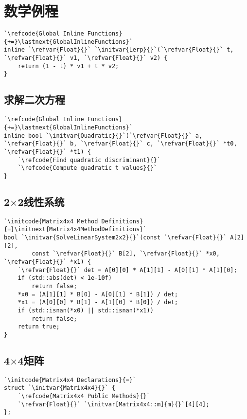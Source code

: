 \section{数学例程}\label{sec:数学例程}

\begin{lstlisting}
`\refcode{Global Inline Functions}{+=}\lastnext{GlobalInlineFunctions}`
inline `\refvar{Float}{}` `\initvar{Lerp}{}`(`\refvar{Float}{}` t, `\refvar{Float}{}` v1, `\refvar{Float}{}` v2) {
    return (1 - t) * v1 + t * v2;
}
\end{lstlisting}
\subsection{求解二次方程}\label{sub:求解二次方程}
\begin{lstlisting}
`\refcode{Global Inline Functions}{+=}\lastnext{GlobalInlineFunctions}`
inline bool `\initvar{Quadratic}{}`(`\refvar{Float}{}` a, `\refvar{Float}{}` b, `\refvar{Float}{}` c, `\refvar{Float}{}` *t0, `\refvar{Float}{}` *t1) {
    `\refcode{Find quadratic discriminant}{}`
    `\refcode{Compute quadratic t values}{}`
}
\end{lstlisting}

\subsection{2$\times$2线性系统}\label{sub:2x2线性系统}
\begin{lstlisting}
`\initcode{Matrix4x4 Method Definitions}{=}\initnext{Matrix4x4MethodDefinitions}`
bool `\initvar{SolveLinearSystem2x2}{}`(const `\refvar{Float}{}` A[2][2],
        const `\refvar{Float}{}` B[2], `\refvar{Float}{}` *x0, `\refvar{Float}{}` *x1) {
    `\refvar{Float}{}` det = A[0][0] * A[1][1] - A[0][1] * A[1][0];
    if (std::abs(det) < 1e-10f)
        return false;
    *x0 = (A[1][1] * B[0] - A[0][1] * B[1]) / det;
    *x1 = (A[0][0] * B[1] - A[1][0] * B[0]) / det;
    if (std::isnan(*x0) || std::isnan(*x1))
        return false;
    return true;
}
\end{lstlisting}

\subsection{4$\times$4矩阵}\label{sub:4x4矩阵}
\begin{lstlisting}
`\initcode{Matrix4x4 Declarations}{=}`
struct `\initvar{Matrix4x4}{}` {
    `\refcode{Matrix4x4 Public Methods}{}`
    `\refvar{Float}{}` `\initvar[Matrix4x4::m]{m}{}`[4][4];
};
\end{lstlisting}


